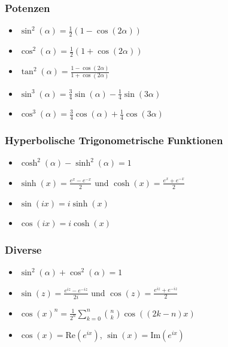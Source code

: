 \documentclass[a4paper,10pt]{article}
\def\Re{\text{Re}}
\def\Im{\text{Im}}
\begin{document}
\subsubsection{Potenzen}
\begin{itemize}
 \item $\sin^2(\alpha) = \frac{1}{2}(1-\cos(2\alpha))$
 \item $\cos^2(\alpha) = \frac{1}{2}(1+\cos(2\alpha))$
 \item $\tan^2(\alpha) = \frac{1-\cos(2\alpha)}{1+\cos(2\alpha)}$
 \item $\sin^3(\alpha) = \frac{3}{4} \sin(\alpha) - \frac{1}{4} \sin(3 \alpha)$
 \item $\cos^3(\alpha) = \frac{3}{4} \cos(\alpha) + \frac{1}{4} \cos(3 \alpha)$
\end{itemize}

\subsubsection{Hyperbolische Trigonometrische Funktionen}
\begin{itemize}
  \item $\cosh^2(\alpha) - \sinh^2(\alpha) = 1$
  \item $\sinh(x) = \frac{e^x - e^{-x}}{2}$ und $\cosh(x) = \frac{e^x + e^{-x}}{2}$
  \item $\sin(ix) = i \sinh(x)$
  \item $\cos(ix) = i \cosh(x)$
 \end{itemize}

\subsubsection{Diverse}

\begin{itemize}
 \item $\sin^2(\alpha) + \cos^2(\alpha) = 1$
 \item $\sin(z) = \frac{e^{iz} - e^{-iz}}{2i}$ und $\cos(z) = \frac{e^{iz} + e^{-iz}}{2}$
 \item $\cos(x)^n = \frac{1}{2^n} \sum_{k=0}^n {n \choose k} \cos((2k - n)x)$
 \item $\cos(x) = \Re(e^{ix})$, $\sin(x) = \Im(e^{ix})$
\end{itemize}
\end{document}
